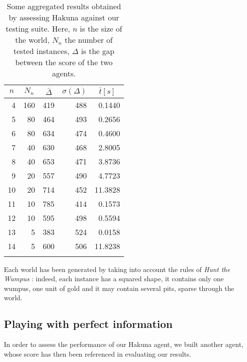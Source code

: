 \documentclass{llncs}
\newcommand{\htw}{\emph{Hunt the Wumpus }}
\begin{document}
\begin{table}[t]
	\label{tbl:test}
	\centering
	\begin{tabular}{rrrrr}
	\toprule
	\multicolumn{1}{c}{$n$} & \multicolumn{1}{c}{$N_n$} & \multicolumn{1}{c}{$\bar{\Delta}$} & \multicolumn{1}{c}{$\sigma(\Delta)$} & \multicolumn{1}{c}{$\bar{t} [s]$}\\
	\midrule
	4 & 160	& 419 & 488 & 0.1440 \\
	5 & 80  & 464 & 493 & 0.2656 \\
	6 & 80  & 634 & 474 & 0.4600 \\
	7 & 40  & 630 & 468 & 2.8005 \\
	8 & 40  & 653 & 471 & 3.8736 \\
	9 & 20  & 557 & 490 & 4.7723 \\
	10 & 20 & 714 & 452 & 11.3828 \\
	11 & 10 & 785 & 414 & 0.1573 \\
	12 & 10 & 595 & 498 & 0.5594 \\
	13 & 5  & 383 & 524 & 0.0158 \\
	14 & 5  & 600 & 506 & 11.8238 \\
	\bottomrule\\
	\end{tabular}
	\caption{Some aggregated results obtained by assessing Hakuna against our testing suite. Here, $n$ is the size of the world, $N_n$ the number of tested instances, $\Delta$ is the gap between the score of the two agents.}
\end{table}

Each world has been generated by taking into account the rules of \htw: indeed, each instance has a squared shape, it contains only one wumpus, one unit of gold and it may contain several pits, sparse through the world.

\subsection{Playing with perfect information}

In order to assess the performance of our Hakuna agent, we built another agent, whose score has then been referenced in evaluating our results.
\end{document}
